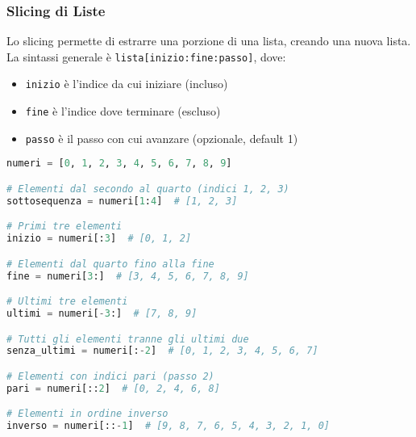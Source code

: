 \subsubsection{Slicing di Liste}\label{SlicingListe}

Lo slicing permette di estrarre una porzione di una lista, creando una nuova lista. La sintassi generale è \texttt{lista[inizio:fine:passo]}, dove:
\begin{itemize}
    \item \texttt{inizio} è l'indice da cui iniziare (incluso)
    \item \texttt{fine} è l'indice dove terminare (escluso)
    \item \texttt{passo} è il passo con cui avanzare (opzionale, default 1)
\end{itemize}

\begin{lstlisting}[language=Python]
numeri = [0, 1, 2, 3, 4, 5, 6, 7, 8, 9]

# Elementi dal secondo al quarto (indici 1, 2, 3)
sottosequenza = numeri[1:4]  # [1, 2, 3]

# Primi tre elementi
inizio = numeri[:3]  # [0, 1, 2]

# Elementi dal quarto fino alla fine
fine = numeri[3:]  # [3, 4, 5, 6, 7, 8, 9]

# Ultimi tre elementi
ultimi = numeri[-3:]  # [7, 8, 9]

# Tutti gli elementi tranne gli ultimi due
senza_ultimi = numeri[:-2]  # [0, 1, 2, 3, 4, 5, 6, 7]

# Elementi con indici pari (passo 2)
pari = numeri[::2]  # [0, 2, 4, 6, 8]

# Elementi in ordine inverso
inverso = numeri[::-1]  # [9, 8, 7, 6, 5, 4, 3, 2, 1, 0]
\end{lstlisting}

